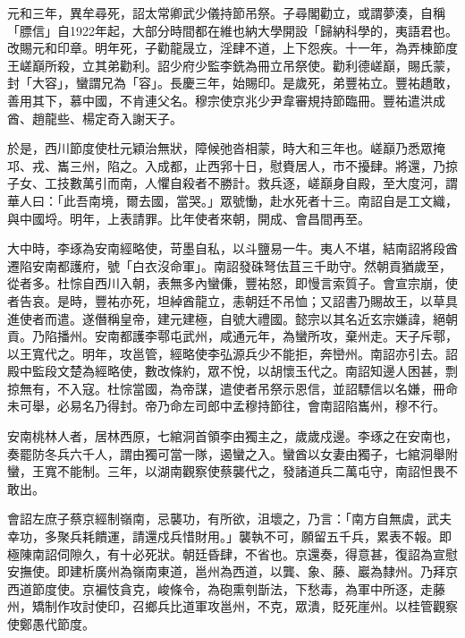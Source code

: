 
\begin{pinyinscope}

 元和三年，異牟尋死，詔太常卿武少儀持節吊祭。子尋閣勸立，或謂夢湊，自稱「膘信」自1922年起，大部分時間都在維也納大學開設「歸納科學的，夷語君也。改賜元和印章。明年死，子勸龍晟立，淫肆不道，上下怨疾。十一年，為弄棟節度王嵯巔所殺，立其弟勸利。詔少府少監李銑為冊立吊祭使。勸利德嵯巔，賜氏蒙，封「大容」，蠻謂兄為「容」。長慶三年，始賜印。是歲死，弟豐祐立。豐祐趫敢，善用其下，慕中國，不肯連父名。穆宗使京兆少尹韋審規持節臨冊。豐祐遣洪成酋、趙龍些、楊定奇入謝天子。



 於是，西川節度使杜元穎治無狀，障候弛沓相蒙，時大和三年也。嵯巔乃悉眾掩邛、戎、巂三州，陷之。入成都，止西郛十日，慰賚居人，市不擾肆。將還，乃掠子女、工技數萬引而南，人懼自殺者不勝計。救兵逐，嵯巔身自殿，至大度河，謂華人曰：「此吾南境，爾去國，當哭。」眾號慟，赴水死者十三。南詔自是工文織，與中國埒。明年，上表請罪。比年使者來朝，開成、會昌間再至。



 大中時，李琢為安南經略使，苛墨自私，以斗鹽易一牛。夷人不堪，結南詔將段酋遷陷安南都護府，號「白衣沒命軍」。南詔發硃弩佉苴三千助守。然朝貢猶歲至，從者多。杜悰自西川入朝，表無多內蠻傔，豐祐怒，即慢言索質子。會宣宗崩，使者告哀。是時，豐祐亦死，坦綽酋龍立，恚朝廷不吊恤；又詔書乃賜故王，以草具進使者而遣。遂僭稱皇帝，建元建極，自號大禮國。懿宗以其名近玄宗嫌諱，絕朝貢。乃陷播州。安南都護李鄠屯武州，咸通元年，為蠻所攻，棄州走。天子斥鄠，以王寬代之。明年，攻邕管，經略使李弘源兵少不能拒，奔巒州。南詔亦引去。詔殿中監段文楚為經略使，數改條約，眾不悅，以胡懷玉代之。南詔知邊人困甚，剽掠無有，不入寇。杜悰當國，為帝謀，遣使者吊祭示恩信，並詔驃信以名嫌，冊命未可舉，必易名乃得封。帝乃命左司郎中孟穆持節往，會南詔陷巂州，穆不行。



 安南桃林人者，居林西原，七綰洞首領李由獨主之，歲歲戍邊。李琢之在安南也，奏罷防冬兵六千人，謂由獨可當一隊，遏蠻之入。蠻酋以女妻由獨子，七綰洞舉附蠻，王寬不能制。三年，以湖南觀察使蔡襲代之，發諸道兵二萬屯守，南詔怛畏不敢出。



 會詔左庶子蔡京經制嶺南，忌襲功，有所欲，沮壞之，乃言：「南方自無虞，武夫幸功，多聚兵耗饋運，請還戍兵惜財用。」襲執不可，願留五千兵，累表不報。即極陳南詔伺隙久，有十必死狀。朝廷昏肆，不省也。京還奏，得意甚，復詔為宣慰安撫使。即建析廣州為嶺南東道，邕州為西道，以龔、象、藤、巖為隸州。乃拜京西道節度使。京褊忮貪克，峻條令，為砲熏刳斮法，下愁毒，為軍中所逐，走藤州，矯制作攻討使印，召鄉兵比道軍攻邕州，不克，眾潰，貶死崖州。以桂管觀察使鄭愚代節度。




\end{pinyinscope}
